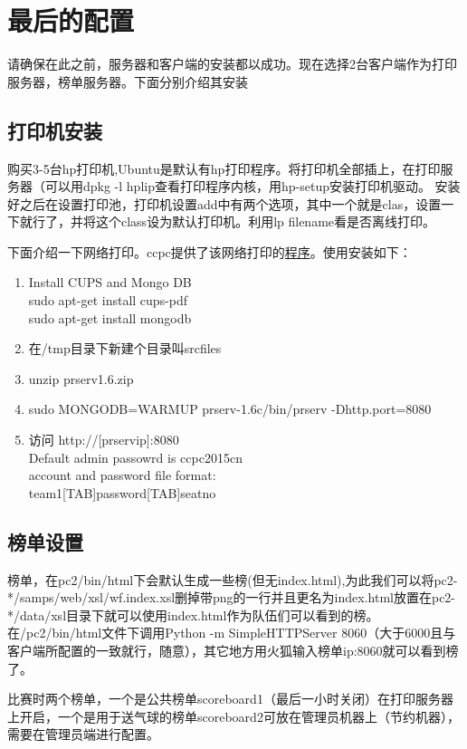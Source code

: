 \documentclass[12pt]{article}
\begin{document}
\section{最后的配置}
请确保在此之前，服务器和客户端的安装都以成功。现在选择2台客户端作为打印服务器，榜单服务器。下面分别介绍其安装


\subsection{打印机安装}
购买3-5台hp打印机,Ubuntu是默认有hp打印程序。将打印机全部插上，在打印服务器（可以用dpkg -l hplip查看打印程序内核，用hp-setup安装打印机驱动。
安装好之后在设置打印池，打印机设置add中有两个选项，其中一个就是clas，设置一下就行了，并将这个class设为默认打印机。利用lp filename看是否离线打印。

下面介绍一下网络打印。ccpc提供了该网络打印的\href{http://board.acmicpc.cn/soft.html}{程序}。使用安装如下：
\begin{enumerate}
\item
Install CUPS and Mongo DB \\
sudo apt-get install cups-pdf \\
sudo apt-get install mongodb
\item
在/tmp目录下新建个目录叫srcfiles
\item
unzip prserv1.6.zip
\item
sudo MONGODB=WARMUP prserv-1.6c/bin/prserv -Dhttp.port=8080
\item
访问 http://[prservip]:8080  \\
Default admin passowrd is ccpc2015cn \\
account and password file format: \\
team1[TAB]password[TAB]seatno 
\end{enumerate}


\subsection{榜单设置}
榜单，在pc2/bin/html下会默认生成一些榜(但无index.html),为此我们可以将pc2-*/samps/web/xsl/wf.index.xsl删掉带png的一行并且更名为index.html放置在pc2-*/data/xsl目录下就可以使用index.html作为队伍们可以看到的榜。在/pc2/bin/html文件下调用Python -m SimpleHTTPServer 8060（大于6000且与客户端所配置的一致就行，随意），其它地方用火狐输入榜单ip:8060就可以看到榜了。

比赛时两个榜单，一个是公共榜单scoreboard1（最后一小时关闭）在打印服务器上开启，一个是用于送气球的榜单scoreboard2可放在管理员机器上（节约机器），需要在管理员端进行配置。
\end{document}
